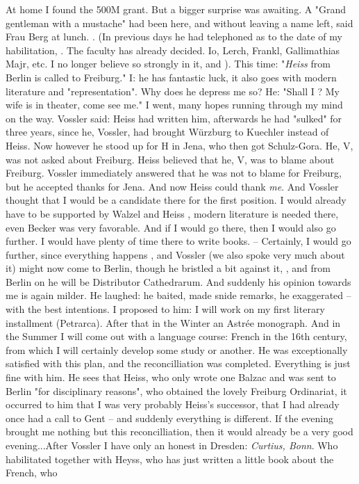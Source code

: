 At home I found the 500M grant. But a bigger surprise was awaiting. A "Grand gentleman with a  mustache" had been here, and without leaving a name left, said Frau Berg at lunch. . (In previous days he had telephoned as to the date of my habilitation, . The faculty has already decided. Io, Lerch, Frankl, Gallimathias Majr, etc. I no longer believe so strongly in it, and ). This time: "\textit{Heiss} from Berlin is called to Freiburg." I: he has fantastic luck, it also goes with modern literature and "representation". Why does he depress me so? He: "Shall I ? My wife is in theater, come see me." I went, many hopes running through my mind on the way. Vossler said: Heiss had written him, afterwards he had "sulked" for three years, since he, Vossler, had brought Würzburg to Kuechler instead of Heiss. Now however he stood up for H in Jena, who then got Schulz-Gora. He, V, was not asked about Freiburg. Heiss believed that he, V, was to blame about Freiburg. Vossler immediately answered that he was not to blame for Freiburg, but he accepted thanks for Jena. And now Heiss could thank \textit{me}. And Vossler thought that I would be a candidate there for the first position. I would already have to be supported by Walzel and Heiss , modern literature is needed there, even Becker was very favorable. And if I would go there, then I would also go further. I would have plenty of time there to write books. -- Certainly, I would go further, since everything happens , and Vossler (we also spoke very much about it) might now come to Berlin, though he bristled a bit against it, , and from Berlin on he will be Distributor Cathedrarum. And suddenly his opinion towards me is again milder. He laughed: he baited, made snide remarks, he exaggerated -- with the best intentions. I proposed to him: I will work on my first literary installment (Petrarca). After that in the Winter an Astrée monograph. And in the Summer I will come out with a language course: French in the 16th century, from which I will certainly develop some study or another. He was exceptionally satisfied with this plan, and the reconcilliation was completed. Everything is just fine with him. He sees that Heiss, who only wrote one Balzac and was sent to Berlin "for disciplinary reasons", who obtained the lovely Freiburg Ordinariat, it occurred to him that I was very probably Heiss's successor, that I had already once had a call to Gent -- and suddenly everything is different. If the evening brought me nothing but this reconcilliation, then it would already be a very good evening...After Vossler I have only an honest  in Dresden: \textit{Curtius, Bonn}. Who habilitated together with Heyss, who has just written a little book about the  French, who 